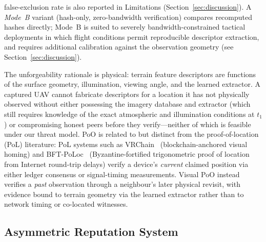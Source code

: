 \documentclass[conference,10pt]{IEEEtran}
\begin{document}
false-exclusion rate is also reported in Limitations (Section~\ref{sec:discussion}). A \emph{Mode~B} variant (hash-only, zero-bandwidth verification) compares recomputed hashes directly; Mode~B is suited to severely bandwidth-constrained tactical deployments in which flight conditions permit reproducible descriptor extraction, and requires additional calibration against the observation geometry (see Section~\ref{sec:discussion}).

The unforgeability rationale is physical: terrain feature descriptors are functions of the surface geometry, illumination, viewing angle, and the learned extractor. A captured UAV cannot fabricate descriptors for a location it has not physically observed without either possessing the imagery database and extractor (which still requires knowledge of the exact atmospheric and illumination conditions at $t_1$) or compromising honest peers before they verify---neither of which is feasible under our threat model. PoO is related to but distinct from the proof-of-location (PoL) literature: PoL systems such as VRChain~\cite{rahouti2022vrchain} (blockchain-anchored visual homing) and BFT-PoLoc~\cite{sheng2024bftpoloc} (Byzantine-fortified trigonometric proof of location from Internet round-trip delays) verify a device's \emph{current} claimed position via either ledger consensus or signal-timing measurements. Visual PoO instead verifies a \emph{past} observation through a neighbour's later physical revisit, with evidence bound to terrain geometry via the learned extractor rather than to network timing or co-located witnesses.

\subsection{Asymmetric Reputation System}
\label{sec:asymmetric-reputation-system}
\end{document}
